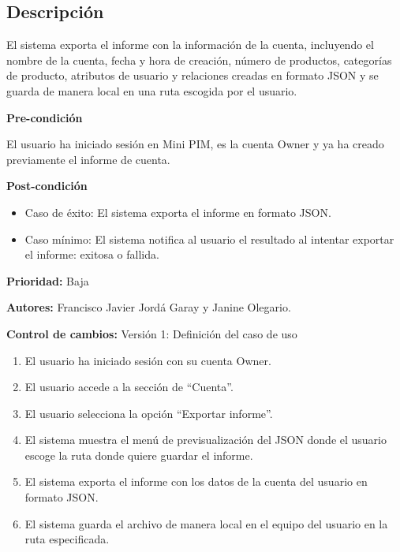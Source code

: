 
\subsection*{Descripción}
El sistema exporta el informe con la información de la cuenta, incluyendo el
nombre de la cuenta, fecha y hora de creación, número de productos, categorías 
de producto, atributos de usuario y relaciones creadas en formato JSON y se guarda 
de manera local en una ruta escogida por el usuario.

\vspace{0.15cm}

\textbf{Pre-condición}\par
El usuario ha iniciado sesión en Mini PIM, es la cuenta Owner y ya ha creado previamente el informe de cuenta.\par
\vspace{0.15cm}

\textbf{Post-condición}
\begin{itemize}
    \item Caso de éxito: El sistema exporta el informe en formato JSON.
    \item Caso mínimo: El sistema notifica al usuario el resultado al intentar exportar el informe: exitosa o fallida.
\end{itemize}

\textbf{Prioridad:}
Baja
\vspace{0.15cm}

\textbf{Autores: }
Francisco Javier Jordá Garay y Janine Olegario.\par
\vspace{0.15cm}

\textbf{Control de cambios: } Versión 1: Definición del caso de uso

\begin{enumerate}
    \item El usuario ha iniciado sesión con su cuenta Owner.
    \item El usuario accede a la sección de \enquote{Cuenta}.
    \item El usuario selecciona la opción \enquote{Exportar informe}.
    \item El sistema muestra el menú de previsualización del JSON donde el usuario escoge la ruta donde quiere guardar el informe.
    \item El sistema exporta el informe con los datos de la cuenta del usuario en formato JSON.
    \item El sistema guarda el archivo de manera local en el equipo del usuario en la ruta especificada.
\end{enumerate}

